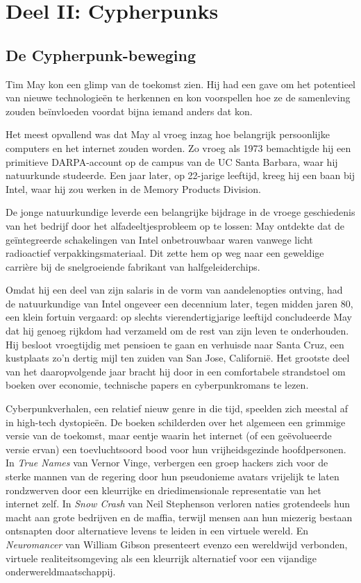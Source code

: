 \documentclass[
  a5paper,
  smalldemyvopaper,11pt,twoside,onecolumn,openright,extrafontsizes]{memoir}
\begin{document}
\part{Deel II: Cypherpunks}

\chapter{De Cypherpunk-beweging}\label{de-cypherpunk-beweging}

Tim May kon een glimp van de toekomst zien. Hij had een gave om het
potentieel van nieuwe technologieën te herkennen en kon voorspellen hoe
ze de samenleving zouden beïnvloeden voordat bijna iemand anders dat
kon.

Het meest opvallend was dat May al vroeg inzag hoe belangrijk
persoonlijke computers en het internet zouden worden. Zo vroeg als 1973
bemachtigde hij een primitieve DARPA-account op de campus van de UC
Santa Barbara, waar hij natuurkunde studeerde. Een jaar later, op
22-jarige leeftijd, kreeg hij een baan bij Intel, waar hij zou werken in
de Memory Products Division.

De jonge natuurkundige leverde een belangrijke bijdrage in de vroege
geschiedenis van het bedrijf door het alfadeeltjesprobleem op te lossen:
May ontdekte dat de geïntegreerde schakelingen van Intel onbetrouwbaar
waren vanwege licht radioactief verpakkingsmateriaal. Dit zette hem op
weg naar een geweldige carrière bij de snelgroeiende fabrikant van
halfgeleiderchips.

Omdat hij een deel van zijn salaris in de vorm van aandelenopties
ontving, had de natuurkundige van Intel ongeveer een decennium later,
tegen midden jaren 80, een klein fortuin vergaard: op slechts
vierendertigjarige leeftijd concludeerde May dat hij genoeg rijkdom had
verzameld om de rest van zijn leven te onderhouden. Hij besloot
vroegtijdig met pensioen te gaan en verhuisde naar Santa Cruz, een
kustplaats zo'n dertig mijl ten zuiden van San Jose, Californië. Het
grootste deel van het daaropvolgende jaar bracht hij door in een
comfortabele strandstoel om boeken over economie, technische papers en
cyberpunkromans te lezen.

Cyberpunkverhalen, een relatief nieuw genre in die tijd, speelden zich
meestal af in high-tech dystopieën. De boeken schilderden over het
algemeen een grimmige versie van de toekomst, maar eentje waarin het
internet (of een geëvolueerde versie ervan) een toevluchtsoord bood voor
hun vrijheidsgezinde hoofdpersonen. In \emph{True Names} van Vernor
Vinge, verbergen een groep hackers zich voor de sterke mannen van de
regering door hun pseudonieme avatars vrijelijk te laten rondzwerven
door een kleurrijke en driedimensionale representatie van het internet
zelf. In \emph{Snow Crash} van Neil Stephenson verloren naties
grotendeels hun macht aan grote bedrijven en de maffia, terwijl mensen
aan hun miezerig bestaan ontsnapten door alternatieve levens te leiden
in een virtuele wereld. En \emph{Neuromancer} van William Gibson
presenteert evenzo een wereldwijd verbonden, virtuele realiteitsomgeving
als een kleurrijk alternatief voor een vijandige
onderwereldmaatschappij.
\end{document}
